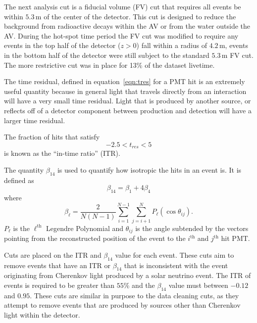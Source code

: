 The next analysis cut is a fiducial volume (FV) cut that requires all events
be within $5.3$\,m of the center of the detector.
This cut is designed to reduce the background from radioactive decays within
the AV or from the water outside the AV\@.
During the hot-spot time period the FV cut was modified to require any events in the
top half of the detector ($z > 0$) fall within a radius of $4.2$\,m,
events in the bottom half of the detector were still subject to the standard
$5.3$\,m FV cut.
The more restrictive cut was in place for 13\% of the dataset livetime.

The time residual, defined in equation~\ref{eqn:tres} for a PMT hit is an extremely
useful quantity because in general light that travels directly from an
interaction will have a very small time residual.
Light that is produced by another source, or reflects off of a detector component
between production and detection will have a larger time residual.


The fraction of hits that satisfy
\begin{equation}
    -2.5 < t_{res} < 5
\end{equation}
is known as the ``in-time ratio'' (ITR).

The quantity $\beta_{14}$ is used to quantify how isotropic the hits
in an event is. It is defined as
\begin{equation}
    \beta_{14} = \beta_{1} + 4\beta_{4}
\end{equation}
where
\begin{equation}
\beta_{\ell} = \frac{2}{N(N-1)}\sum_{i=1}^{N-1}\sum_{j=i+1}^{N}P_{\ell}(\cos\theta_{ij})\text{.}
\end{equation}
$P_{\ell}$ is the $\ell^{\text{th}}$ Legendre Polynomial and
$\theta_{ij}$ is the angle subtended by the vectors pointing
from the reconstructed position of the event to the $i^{\text{th}}$ and
$j^{\text{th}}$ hit PMT\@.

Cuts are placed on the ITR and $\beta_{14}$ value for each event.
These cuts aim to remove events
that have an ITR or $\beta_{14}$ 
that is inconsistent with the event originating from Cherenkov light produced
by a solar neutrino event.
The ITR of events is required to be greater than $55$\% and the $\beta_{14}$
value must between $-0.12$ and $0.95$.
These cuts are similar in purpose to the data cleaning cuts, as they attempt to
remove events that are produced by sources other than Cherenkov light within
the detector.

